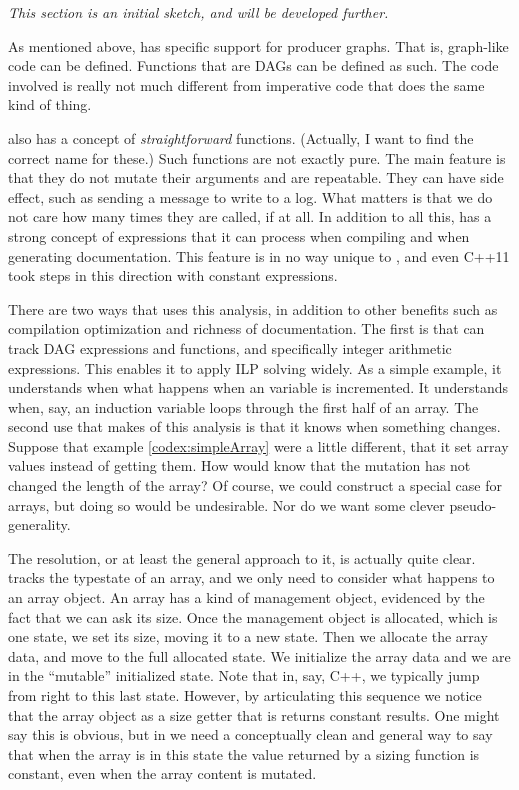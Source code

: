 \documentclass[10pt]{amsart}
\begin{document}
\emph{This section is an initial sketch, and will be developed further.}

As mentioned above, \Utop has specific support for producer graphs.
That is, graph-like code can be defined.  Functions that are DAGs can
be defined as such.  The code involved is really not much different
from imperative code that does the same kind of thing.

\Utop also has a concept of \emph{straightforward} functions.
(Actually, I want to find the correct name for these.)  Such functions
are not exactly pure.  The main feature is that they do not mutate
their arguments and are repeatable.  They can have side effect, such
as sending a message to write to a log.  What matters is that we do
not care how many times they are called, if at all.  In addition to
all this, \Utop has a strong concept of expressions that it can
process when compiling and when generating documentation.  This
feature is in no way unique to \Utop, and even C++11 took steps in
this direction with constant expressions.

There are two ways that \Utop uses this analysis, in addition to other
benefits such as compilation optimization and richness of
documentation.  The first is that \Utop can track DAG expressions and
functions, and specifically integer arithmetic expressions.  This
enables it to apply ILP solving widely.  As a simple example, it
understands when what happens when an variable is incremented.  It
understands when, say, an induction variable loops through the first half
of an array.  The second use that \Utop makes of this analysis is that
it knows when something changes.  Suppose that example
\ref{codex:simpleArray} were a little different, that it set array
values instead of getting them.  How would \Utop know that the
mutation has not changed the length of the array?  Of course, we could
construct a special case for arrays, but doing so would be
undesirable.  Nor do we want some clever pseudo-generality.

The resolution, or at least the general approach to it, is actually
quite clear.  \Utop tracks the typestate of an array, and we only need
to consider what happens to an array object.  An array has a kind of
management object, evidenced by the fact that we can ask its size.
Once the management object is allocated, which is one state, we set
its size, moving it to a new state.  Then we allocate the array data,
and move to the full allocated state.  We initialize the array data
and we are in the ``mutable'' initialized state.  Note that in, say,
C++, we typically jump from right to this last state.  However, by
articulating this sequence we notice that the array object as a size
getter that is returns constant results.  One might say this is
obvious, but in \Utop we need a conceptually clean and general way to
say that when the array is in this state the value returned by a
sizing function is constant, even when the array content is mutated.
\end{document}

